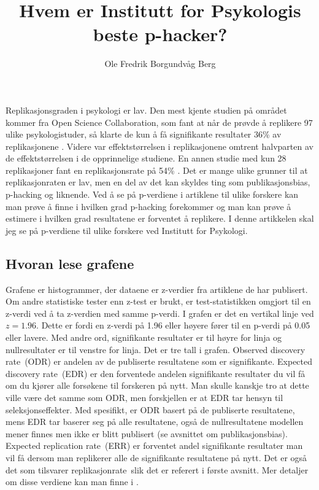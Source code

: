 \documentclass[doc,norsk]{apa7}
\title{Hvem er Institutt for Psykologis beste p-hacker?}
\author{Ole Fredrik Borgundvåg Berg}
\affiliation{NTNU}
\begin{document}
\maketitle

Replikasjonsgraden i psykologi er lav. Den mest kjente studien på området kommer fra Open Science Collaboration, som fant at når de prøvde å replikere 97 ulike psykologistuder, så klarte de kun å få signifikante resultater 36\% av replikasjonene \parencite{open-replikasjon}. Videre var effektstørrelsen i replikasjonene omtrent halvparten av de effektstørrelsen i de opprinnelige studiene. En annen studie med kun 28 replikasjoner fant en replikasjonsrate på 54\% \parencite{replikasjonsrate-2}. Det er mange ulike grunner til at replikasjonraten er lav, men en del av det kan skyldes ting som publikasjonsbias, p-hacking og liknende. Ved å se på p-verdiene i artiklene til ulike forskere kan man prøve å finne i hvilken grad p-hacking forekommer og man kan prøve å estimere i hvilken grad resultatene er forventet å replikere. I denne artikkelen skal jeg se på p-verdiene til ulike forskere ved Institutt for Psykologi. 

\subsection{Hvoran lese grafene}
Grafene er histogrammer, der dataene er z-verdier fra artiklene de har publisert. Om andre statistiske tester enn z-test er brukt, er test-statistikken omgjort til en z-verdi ved å ta z-verdien med samme p-verdi. I grafen er det en vertikal linje ved $z=1.96$. Dette er fordi en z-verdi på 1.96 eller høyere fører til en p-verdi på 0.05 eller lavere. Med andre ord, signifikante resultater er til høyre for linja og nullresultater er til venstre for linja. Det er tre tall i grafen. \guillemetleft Observed discovery rate\guillemetright\ (ODR) er andelen av de publiserte resultatene som er signifikante. \guillemetleft Expected discovery rate\guillemetright\ (EDR) er den forventede andelen signifikante resultater du vil få om du kjører alle forsøkene til forskeren på nytt. Man skulle kanskje tro at dette ville være det samme som ODR, men forskjellen er at EDR tar hensyn til seleksjonseffekter. Med spesifikt, er ODR basert på de publiserte resultatene, mens EDR tar baserer seg på alle resultatene, også de nullresultatene modellen mener finnes men ikke er blitt publisert (se avsnittet om publikasjonsbias). \guillemotleft Expected replication rate\guillemetright\ (ERR) er forventet andel signifikante resultater man vil få dersom man replikerer alle de signifikante resultatene på nytt. Det er også det som tilsvarer \guillemetleft replikasjonrate\guillemetright\ slik det er referert i første avsnitt. Mer detaljer om disse verdiene kan man finne i \textcite{z-curve-implementasjon}.
\end{document}
